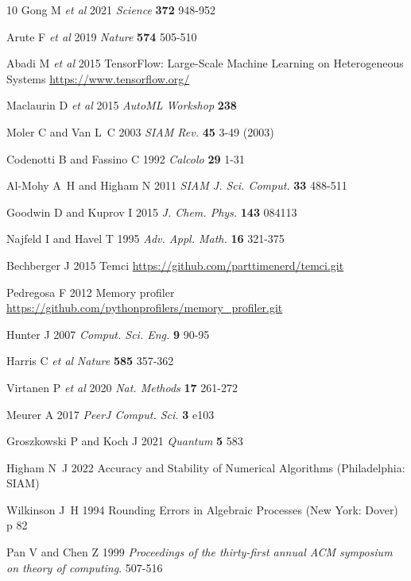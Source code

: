 \documentclass[letterpaper,10pt]{iopart}
\begin{document}
\begin{thebibliography}{10}
Gong M {\em et al\/}
2021
{\em Science}
{\bf372} 948-952 

Arute F {\em et al\/}
2019
{\em Nature}
\textbf{574} 505-510  

Abadi M {\em et al\/}
2015
TensorFlow: Large-Scale Machine Learning on Heterogeneous Systems
\url{https://www.tensorflow.org/}

Maclaurin D {\em et al\/}
2015
{\em AutoML Workshop}
\textbf{238}  

Moler C and Van L~C
2003
{\em SIAM Rev.}
\textbf{45} 3-49 (2003)

Codenotti B and Fassino C 
1992
{\em Calcolo}
\textbf{29} 1-31 

Al-Mohy A~H and Higham N 
2011
{\em SIAM J. Sci. Comput.}
\textbf{33} 488-511  

Goodwin D and Kuprov I
2015
{\em J. Chem. Phys.}
\textbf{143} 084113 

Najfeld I and Havel T 
1995
{\em Adv. Appl. Math. }
\textbf{16} 321-375 

Bechberger J
2015
Temci
\url{https://github.com/parttimenerd/temci.git}

Pedregosa F
2012
Memory profiler
\url{https://github.com/pythonprofilers/memory_profiler.git}

Hunter J
2007
{\em Comput. Sci. Eng.}
\textbf{9} 90-95 

Harris C {\em et al\/}
{\em Nature}
\textbf{585} 357-362 

Virtanen P {\em et al\/}
2020
{\em Nat. Methods}
\textbf{17} 261-272 

Meurer A 
2017
{\em PeerJ Comput. Sci.}
\textbf{3}  e103 

Groszkowski P and Koch J 
2021
{\em Quantum}
\textbf{5} 583 

Higham N~J
2022
Accuracy and Stability of Numerical Algorithms
(Philadelphia: SIAM)

Wilkinson J~H
1994
Rounding Errors in Algebraic Processes (New York: Dover)
p 82

Pan V and Chen Z 
1999
{\em Proceedings of the thirty-first annual ACM symposium on theory of computing}. 
 507-516 
\end{thebibliography}
\end{document}

